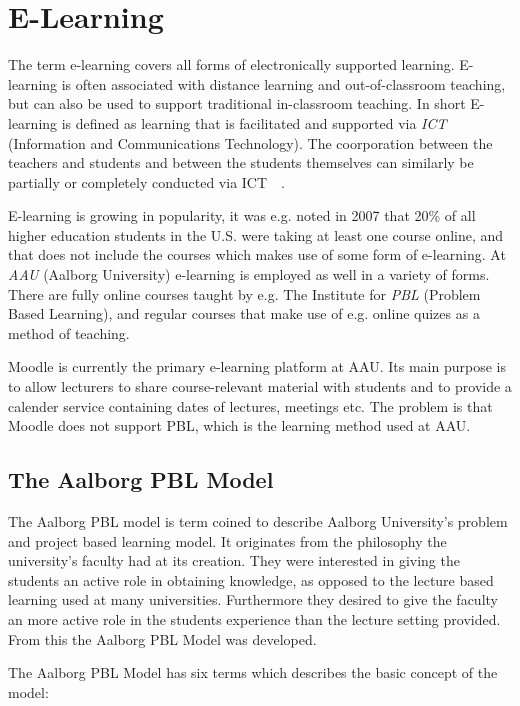 \section{E-Learning}
The term e-learning covers all forms of electronically supported learning. E-learning is often associated with distance learning and out-of-classroom teaching, but can also be used to support traditional in-classroom teaching. In short E-learning is defined as learning that is facilitated and supported via \emph{ICT} (Information and Communications Technology). The coorporation between the teachers and students and between the students themselves can similarly be partially or completely conducted via ICT~\citep{def_e-learning1}~\citep{def_e-learning2}.

E-learning is growing in popularity, it was e.g. noted in 2007 that 20\% of all higher education students in the U.S. were taking at least one course online, and that does not include the courses which makes use of some form of e-learning.	At \emph{AAU} (Aalborg University) e-learning is employed as well in a variety of forms. There are fully online courses taught by e.g. The Institute for \emph{PBL} (Problem Based Learning), and regular courses that make use of e.g. online quizes as a method of teaching. 

Moodle is currently the primary e-learning platform at AAU. Its main purpose is to allow lecturers to share course-relevant material with students and to provide a calender service containing dates of lectures, meetings etc. The problem is that Moodle does not support PBL, which is the learning method used at AAU.

\subsection{The Aalborg PBL Model}
The Aalborg PBL model is term coined to describe Aalborg University's problem and project based learning model. It originates from the philosophy the university's faculty had at its creation. They were interested in giving the students an active role in obtaining knowledge, as opposed to the lecture based learning used at many universities. Furthermore they desired to give the faculty an more active role in the students experience than the lecture setting provided. From this the Aalborg PBL Model was developed.

The Aalborg PBL Model has six terms which describes the basic concept of the model:

